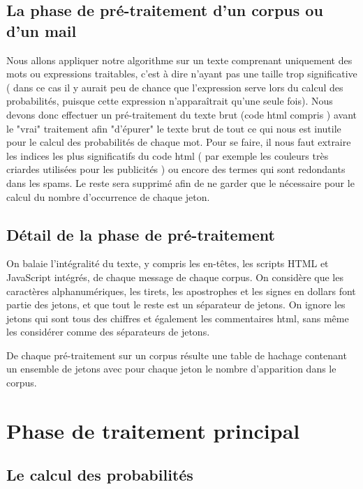 \documentclass{article}
\begin{document}
\subsection{La phase de pré-traitement d'un corpus ou d'un mail}

Nous allons appliquer notre algorithme sur un texte comprenant uniquement des mots ou expressions traitables, c'est à dire n'ayant pas une taille trop significative ( dans ce cas il y aurait peu de chance que l'expression serve lors du calcul des probabilités, puisque cette expression n’apparaîtrait qu'une seule fois). Nous devons donc effectuer un pré-traitement du texte brut (code html compris ) avant le "vrai" traitement afin "d'épurer" le texte brut de tout ce qui nous est inutile pour le calcul des probabilités de chaque mot. 
Pour se faire, il nous faut extraire les indices les plus significatifs du code html ( par exemple les couleurs très criardes utilisées pour les publicités ) ou encore des termes qui sont redondants dans les spams. Le reste sera supprimé afin de ne garder que le nécessaire pour le calcul du nombre d'occurrence de chaque jeton. 

\subsection{Détail de la phase de pré-traitement}

On balaie l'intégralité du texte, y compris les en-têtes, les scripts HTML et JavaScript intégrés, de chaque message de chaque corpus. On considère  que les caractères alphanumériques, les tirets, les apostrophes et les signes en dollars font partie des jetons, et que tout le reste est un séparateur de jetons. On ignore les jetons qui sont tous des chiffres et également les commentaires html, sans même les considérer comme des séparateurs de jetons.

De chaque pré-traitement sur un corpus résulte une table de hachage contenant un ensemble de jetons avec pour chaque jeton le nombre d'apparition dans le corpus.

\section{Phase de traitement principal}

\subsection{Le calcul des probabilités}
\end{document}
